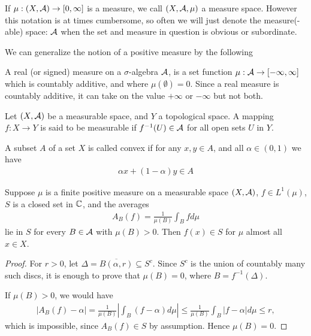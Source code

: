 \documentclass[../../main.tex]{subfiles}
\begin{document}
If $\mu:(X,\mathcal{A})\to [0, \infty]$ is a measure, we call $(X, \mathcal{A}, \mu)$ a measure space. However this notation is at times cumbersome, so often we will just denote the measure(-able) space: $\mathcal{A}$ when the set and measure in question is obvious or subordinate.

We can generalize the notion of a positive measure by the following

\begin{definition}
A real (or signed) measure on a $\sigma$-algebra $\mathcal{A}$, is a set function $\mu: \mathcal{A} \to [-\infty, \infty]$ which is countably additive, and where $\mu(\emptyset)=0$. Since a real measure is countably additive, it can take on the value $+\infty$ or $-\infty$ but not both.
\end{definition}


\begin{definition}
Let $(X, \mathcal{A})$ be a measurable space, and $Y$ a topological space. A mapping $f: X \to Y$ is said to be measurable if $f^{-1}(U)\in \mathcal{A}$ for all open sets $U$ in $Y$.
\end{definition}

\begin{definition}
A subset $A$ of a set $X$ is called convex if for any $x,y \in A$, and all $\alpha \in (0,1)$ we have
\begin{align*}
	\alpha x + (1-\alpha)y \in A
\end{align*}
\end{definition}

\begin{theorem}\label{thm: average lies in S}
Suppose $\mu$ is a finite positive measure on a measurable space $(X, \mathcal{A})$, $f\in L^{1}(\mu)$, $S$ is a closed set in $\mathbb{C}$, and the averages
\begin{align*}
	A_{B}(f)=\frac{1}{\mu(B)}\int_{B}fd\mu
\end{align*}
lie in $S$ for every $B\in \mathcal{A}$ with $\mu(B)>0$. Then $f(x)\in S$ for $\mu$ almost all $x \in X$.
\end{theorem}
\begin{proof}
For $r>0$, let $\Delta=\overline{B(\alpha, r)}\subseteq S^{c}$. Since $S^{c}$ is the union of countably many such discs, it is enough to prove that $\mu(B)=0$, where $B=f^{-1}(\Delta)$.

If $\mu(B)>0$, we would have
\begin{align*}
	|A_{B}(f)-\alpha| = \frac{1}{\mu(B)} \left| \int_{B}(f-\alpha)d\mu \right| \le \frac{1}{\mu(B)} \int_{B}|f-\alpha|d\mu \le r,
\end{align*}
which is impossible, since $A_{B}(f)\in S$ by assumption. Hence $\mu(B)=0$.
\end{proof}
\end{document}
